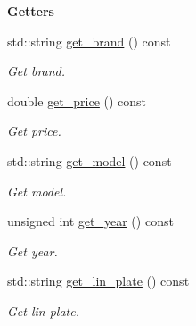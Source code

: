 \begin{Indent}{\bf Getters}\par
\begin{DoxyCompactItemize}
\item 
std\+::string \hyperlink{class_cautomobile_a2194e32fb5aeaf71dea2a346db3d75e0}{get\+\_\+brand} () const 
\begin{DoxyCompactList}\small\item\em Get brand. \end{DoxyCompactList}\item 
double \hyperlink{class_cautomobile_aa1271b8e3583809af8a00f0989d3ef10}{get\+\_\+price} () const 
\begin{DoxyCompactList}\small\item\em Get price. \end{DoxyCompactList}\item 
std\+::string \hyperlink{class_cautomobile_a5ab4c602bf31488b19e7a2d5240a96ef}{get\+\_\+model} () const 
\begin{DoxyCompactList}\small\item\em Get model. \end{DoxyCompactList}\item 
unsigned int \hyperlink{class_cautomobile_adba2be0026ebbeeb1c695f4994b962f3}{get\+\_\+year} () const 
\begin{DoxyCompactList}\small\item\em Get year. \end{DoxyCompactList}\item 
std\+::string \hyperlink{class_cautomobile_a33087bf4433b9ffc1b43edba6bb68f12}{get\+\_\+lin\+\_\+plate} () const 
\begin{DoxyCompactList}\small\item\em Get lin plate. \end{DoxyCompactList}\end{DoxyCompactItemize}
\end{Indent}
